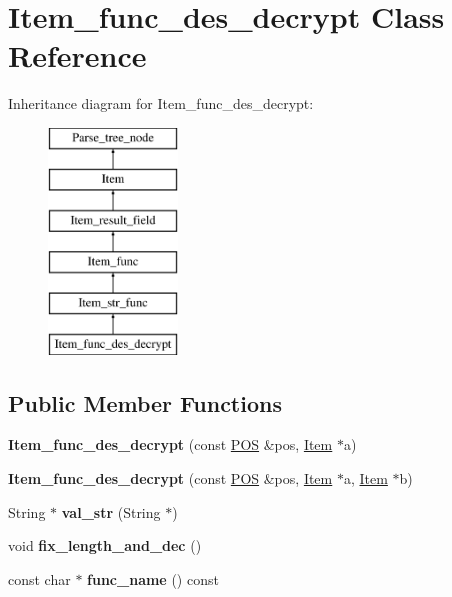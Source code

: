 \hypertarget{classItem__func__des__decrypt}{}\section{Item\+\_\+func\+\_\+des\+\_\+decrypt Class Reference}
\label{classItem__func__des__decrypt}
Inheritance diagram for Item\+\_\+func\+\_\+des\+\_\+decrypt\+:\begin{figure}[H]
\begin{center}
\leavevmode
\includegraphics[height=6.000000cm]{classItem__func__des__decrypt}
\end{center}
\end{figure}
\subsection*{Public Member Functions}
\begin{DoxyCompactItemize}
\item 
\mbox{\label{classItem__func__des__decrypt_aee1f18dac1dac8d6c0f1c4bfade830c9}} 
{\bfseries Item\+\_\+func\+\_\+des\+\_\+decrypt} (const \mbox{\hyperlink{structYYLTYPE}{P\+OS}} \&pos, \mbox{\hyperlink{classItem}{Item}} $\ast$a)
\item 
\mbox{\label{classItem__func__des__decrypt_add55a176d2e2a4d675b9929803e5ba18}} 
{\bfseries Item\+\_\+func\+\_\+des\+\_\+decrypt} (const \mbox{\hyperlink{structYYLTYPE}{P\+OS}} \&pos, \mbox{\hyperlink{classItem}{Item}} $\ast$a, \mbox{\hyperlink{classItem}{Item}} $\ast$b)
\item 
\mbox{\label{classItem__func__des__decrypt_a567a974a6bb0bf014c6230723a0df419}} 
String $\ast$ {\bfseries val\+\_\+str} (String $\ast$)
\item 
\mbox{\label{classItem__func__des__decrypt_ad103f2288d8ebe227257ba24d7404d88}} 
void {\bfseries fix\+\_\+length\+\_\+and\+\_\+dec} ()
\item 
\mbox{\label{classItem__func__des__decrypt_af6a42bdad29f1cc40a9864c512f7c7a4}} 
const char $\ast$ {\bfseries func\+\_\+name} () const
\end{DoxyCompactItemize}
